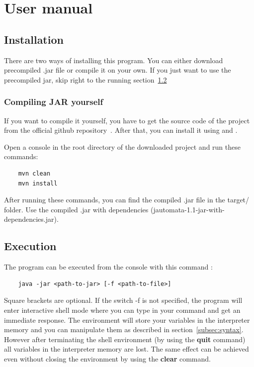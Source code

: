 \documentclass{ctuthesis}
\begin{document}
\chapter{User manual}
\section{Installation}
There are two ways of installing this program. You can either download precompiled .jar file or compile it on your own. If you just want to use the precompiled jar, skip right to the running section~\ref{sec:execution}

\subsection{Compiling JAR yourself}
\label{compile}
If you want to compile it yourself, you have to get the source code of the project from the official github repository~\cite{repo}. After that, you can install it using \cite{maven} and \cite{jdk}. 

Open a console in the root directory of the downloaded project and run these commands:
\begin{verbatim}
	mvn clean
	mvn install
\end{verbatim}

After running these commands, you can find the compiled .jar file in the target/ folder. Use the compiled .jar with dependencies (jautomata-1.1-jar-with-dependencies.jar).

\section{Execution}
\label{sec:execution}
The program can be executed from the console with this command :

\begin{verbatim}
	java -jar <path-to-jar> [-f <path-to-file>] 
\end{verbatim}

Square brackets are optional. If the switch -f is not specified, the program will enter interactive shell mode where you can type in your command and get an immediate response. The environment will store your variables in the interpreter memory and you can manipulate them as described in section~\ref{subsec:syntax}. However after terminating the shell environment (by using the \textbf{quit} command) all variables in the interpreter memory are lost. The same effect can be achieved even without closing the environment by using the \textbf{clear} command. 
\end{document}
